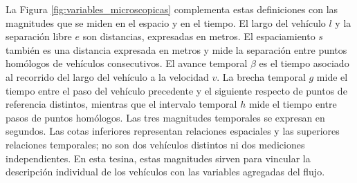 La Figura \ref{fig:variables_microscopicas} complementa estas definiciones con las magnitudes que se miden en el espacio y en el tiempo. El largo del vehículo $l$ y la separación libre $e$ son distancias, expresadas en metros. El espaciamiento $s$ también es una distancia expresada en metros y mide la separación entre puntos homólogos de vehículos consecutivos. El avance temporal $\beta$ es el tiempo asociado al recorrido del largo del vehículo a la velocidad $v$. La brecha temporal $g$ mide el tiempo entre el paso del vehículo precedente y el siguiente respecto de puntos de referencia distintos, mientras que el intervalo temporal $h$ mide el tiempo entre pasos de puntos homólogos. Las tres magnitudes temporales se expresan en segundos. Las cotas inferiores representan relaciones espaciales y las superiores relaciones temporales; no son dos vehículos distintos ni dos mediciones independientes. En esta tesina, estas magnitudes sirven para vincular la descripción individual de los vehículos con las variables agregadas del flujo.

